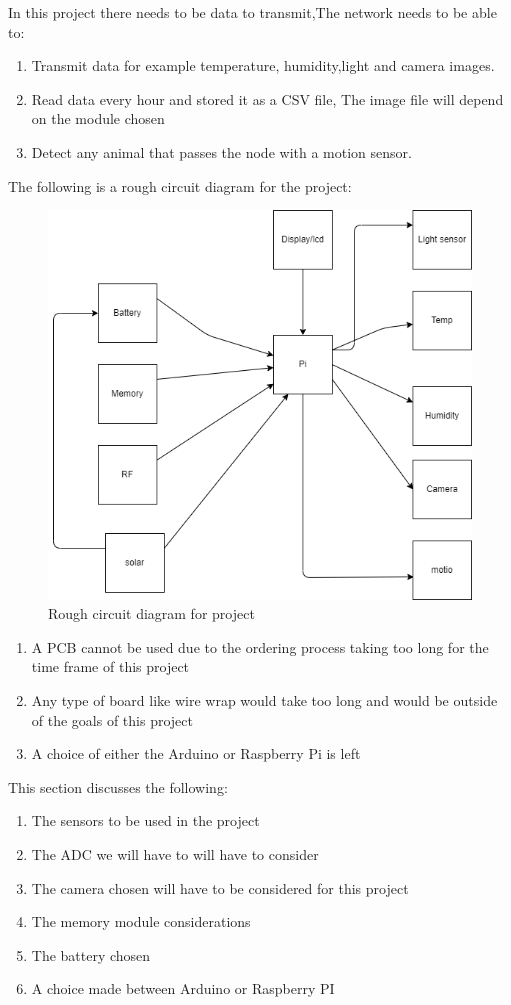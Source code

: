 In this project there needs to be data to transmit,The network needs to be able to:
\begin{enumerate}
	\item Transmit  data for  example  temperature, humidity,light and camera images.
	\item Read data every hour  and  stored it as a CSV file, The image file  will depend on the module chosen
	\item Detect  any animal that passes  the  node with a motion sensor. 
\end{enumerate}
\newpage
The following is  a  rough circuit diagram  for the project:
\begin{figure}[h!]
	\centering
	\includegraphics[width=0.5\linewidth]{Images/block_diagram_for_mesh_device.png}
	\caption{Rough circuit diagram for project}
	\label{Rough circuit diagram for project}
\end{figure}
\begin{enumerate}
	\item A PCB cannot be used due to  the ordering process taking too long for the time frame of this project 
	\item Any  type of board like wire wrap  would take too long and would be outside of  the  goals of this project
	\item A  choice of either the  Arduino or Raspberry Pi is left
\end{enumerate}
This section discusses the following:
\begin{enumerate}
	\item The sensors to be used in the project
	\item The ADC we will have  to will have to  consider
	\item The camera chosen will have to be  considered  for this project
	\item The memory module considerations
	\item The battery chosen
	\item A choice made between Arduino or Raspberry PI
\end{enumerate}

